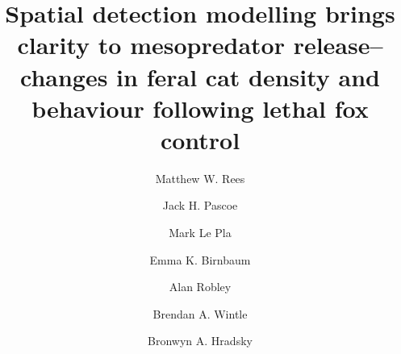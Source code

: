 \documentclass[]{elsarticle} %
\begin{document}
\begin{frontmatter}

  \title{Spatial detection modelling brings clarity to mesopredator release--changes in feral cat density and behaviour following lethal fox control}
    \author[UOM]{Matthew W. Rees}
    \author[CEC]{Jack H. Pascoe}
  
    \author[CEC]{Mark Le Pla}
  
    \author[CEC]{Emma K. Birnbaum}
  
    \author[ARI]{Alan Robley}
  
    \author[UOM]{Brendan A. Wintle}
  
    \author[UOM]{Bronwyn A. Hradsky}
  
      \address[UOM]{Quantitative \& Applied Ecology Group, School of Ecosystem and Forest Science, The University of Melbourne, Parkville, VIC, Australia}
    \address[CEC]{Conservation Ecology Centre, Otway Lighthouse Rd, Cape Otway, VIC, Australia}
    \address[ARI]{Department of Environment, Land, Water and Planning, Arthur Rylah Institute for Environmental Research, Heidelberg, Australia}
  

\end{frontmatter}
\end{document}
